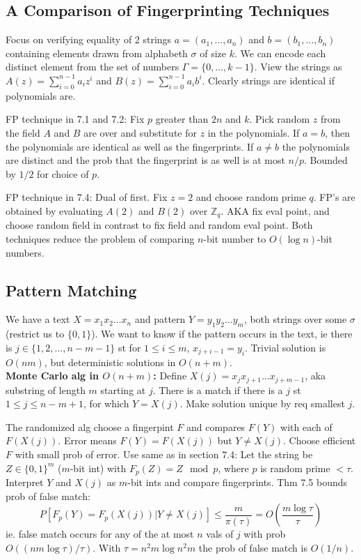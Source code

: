 \documentclass[a4paper]{article}
\begin{document}
\subsection{A Comparison of Fingerprinting Techniques}
\label{sub:A Comparison of Fingerprinting Techniques}
Focus on verifying equality of 2 strings $a=(a_1,\ldots,a_n)$ and $b=(b_1,\ldots,b_n)$ containing elements drawn from alphabeth $\sigma$ of size $k$. We can encode each distinct element from the set of numbers $\Gamma =\{0,\ldots,k-1\}$. View the strings as $A(z)=\sum^{n-1}_{i=0}a_iz^i $ and $B(z)=\sum^{n-1}_{i=0}a_ib^i $. Clearly strings are identical if polynomials are.

FP technique in 7.1 and 7.2: Fix $p$ greater than $2n$ and $k$. Pick random $z$ from the field $A$ and $B$ are over and substitute for $z$ in the polynomials. If $a=b$, then the polynomials are identical as well as the fingerprints. If $a\not = b$ the polynomials are distinct and the prob that the fingerprint is as well is at most $n/p$. Bounded by $1/2$ for choice of $p$.

FP technique in 7.4: Dual of first. Fix $z=2$ and choose random prime $q$. FP's are obtained by evaluating $A(2)$ and $B(2)$ over $\mathbb{Z}_q$. AKA fix eval point, and choose random field in contrast to fix field and random eval point. Both techniques reduce the problem of comparing $n$-bit number to $O(\log n)$-bit numbers.

\subsection{Pattern Matching}
\label{sub:Pattern Matching}
We have a text $X=x_1x_2\ldots x_n$ and pattern $Y=y_1y_2\ldots y_m$, both strings over some $\sigma$ (restrict us to $\{0,1\}$). We want to know if the pattern occurs in the text, ie there is $j\in\{1,2,\ldots,n-m-1\}$ st for $1\leq i\leq m$, $x_{j+i-1}=y_i$. Trivial solution is $O(nm)$, but deterministic solutions in $O(n+m)$.\\

\textbf{Monte Carlo alg in $O(n+m)$:} Define $X(j)=x_jx_{j+1}\ldots x_{j+m-1}$, aka substring of length $m$ starting at $j$. There is a match if there is a $j$ st $1\leq j\leq n-m+1$, for which $Y=X(j)$. Make solution unique by req smallest $j$.

The randomized alg choose a fingerpint $F$ and compares $F(Y)$ with each of $F(X(j))$. Error means $F(Y)=F(X(j))$ but $Y\not = X(j)$. Choose efficient $F$ with small prob of error. Use same as in section 7.4: Let the string be $Z\in\{0,1\}^m$ ($m$-bit int) with $F_p(Z)=Z\mod p$, where $p$ is random prime $<\tau$. Interpret $Y$ and $X(j)$ as $m$-bit ints and compare fingerprints. Thm 7.5 bounds prob of false match:
$$
P[F_p(Y)=F_p(X(j))| Y\not = X(j)]\leq \frac{m}{\pi(\tau)} =O\left(\frac{m\log \tau}{\tau} \right)
$$
ie. false match occurs for any of the at most $n$ vals of $j$ with prob $O((nm\log\tau)/\tau)$. With $\tau = n^2m\log n^2m$ the prob of false match is $O(1/n)$.
\end{document}

